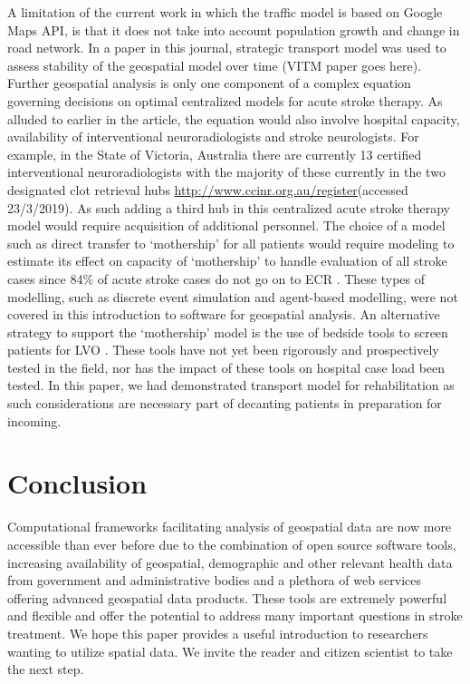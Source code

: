 \documentclass[utf8]{frontiersHLTH}
\begin{document}
A limitation of the current work in which the traffic model is based
on Google Maps API, is that it does not take into account population
growth and change in road network. In a paper in this journal,
strategic transport model was used to assess stability of the
geospatial model over time (VITM paper goes here). Further geospatial
analysis is only one component of a complex equation governing
decisions on optimal centralized models for acute stroke therapy. As
alluded to earlier in the article, the equation would also involve
hospital capacity, availability of interventional neuroradiologists
and stroke neurologists. For example, in the State of Victoria,
Australia there are currently 13 certified interventional
neuroradiologists with the majority of these currently in the two
designated clot retrieval hubs
\url{http://www.ccinr.org.au/register}(accessed 23/3/2019). As such
adding a third hub in this centralized acute stroke therapy model
would require acquisition of additional personnel. The choice of a
model such as direct transfer to ‘mothership’ for all patients would
require modeling to estimate its effect on capacity of ‘mothership’ to
handle evaluation of all stroke cases since 84\% of acute stroke cases
do not go on to ECR \cite{man2018comparison} . These types of
modelling, such as discrete event simulation and agent-based
modelling, were not covered in this introduction to software for
geospatial analysis.  An alternative strategy to support the
‘mothership’ model is the use of bedside tools to screen patients for
LVO \cite{}. These tools have not yet been rigorously and
prospectively tested in the field, nor has the impact of these tools
on hospital case load been tested. In this paper, we had demonstrated
transport model for rehabilitation as such considerations are
necessary part of decanting patients in preparation for incoming.

\section{Conclusion} 
Computational frameworks facilitating analysis of geospatial data are
now more accessible than ever before due to the combination of open
source software tools, increasing availability of geospatial,
demographic and other relevant health data from government and
administrative bodies and a plethora of web services offering advanced
geospatial data products. These tools are extremely powerful and
flexible and offer the potential to address many important questions
in stroke treatment. We hope this paper provides a useful introduction
to researchers wanting to utilize spatial data. We invite the reader
and citizen scientist to take the next step.
\end{document}
